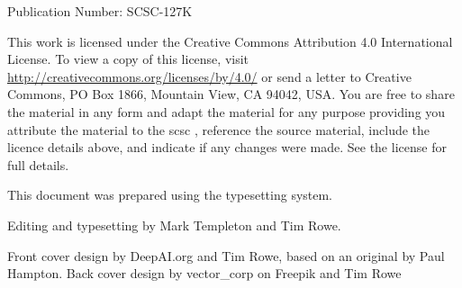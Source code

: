 %
%

%
%

\pagestyle{FirstPageFrontCover}
%
%



 Publication Number: SCSC-127K

This work is licensed under the Creative Commons Attribution 4.0 International License. To view a copy of this license, visit \href{http://creativecommons.org/licenses/by/4.0/}{http://creativecommons.org/licenses/by/4.0/} or send a letter to Creative Commons, PO Box 1866, Mountain View, CA 94042, USA\@. You are free to share the material in any form and adapt the material for any purpose providing you attribute the material to the \gls{scsc} , reference the source material, include the licence details above, and indicate if any changes were made.  See the license for full details.

This document was prepared using the \LaTeXe\/ typesetting system.

Editing and typesetting by Mark Templeton and Tim Rowe.

Front cover design by DeepAI.org and Tim Rowe, based on an original by Paul Hampton.
Back cover design by vector\_corp on Freepik and Tim Rowe


